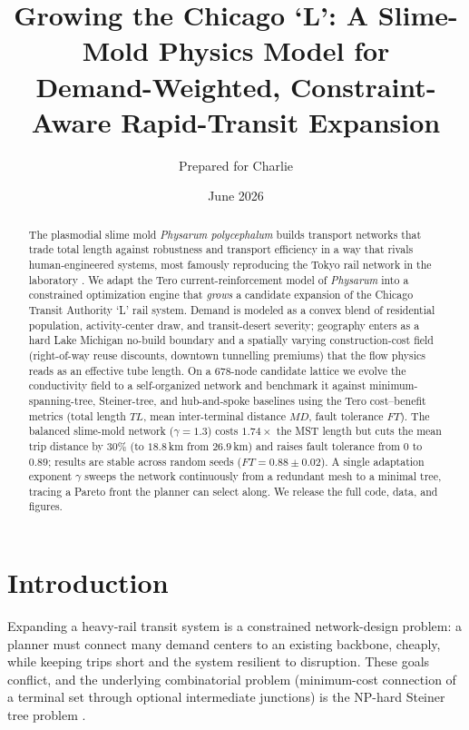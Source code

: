 \documentclass[11pt]{article}
\title{\bfseries Growing the Chicago `L': A Slime-Mold Physics Model for \\
Demand-Weighted, Constraint-Aware Rapid-Transit Expansion}
\author{Prepared for Charlie}
\date{June 2026}
\begin{document}
\maketitle

\begin{abstract}
\noindent The plasmodial slime mold \emph{Physarum polycephalum} builds transport
networks that trade total length against robustness and transport efficiency in a
way that rivals human-engineered systems, most famously reproducing the Tokyo rail
network in the laboratory \citep{tero2010}. We adapt the Tero current-reinforcement
model of \emph{Physarum} into a constrained optimization engine that \emph{grows} a
candidate expansion of the Chicago Transit Authority `L' rail system. Demand is
modeled as a convex blend of residential population, activity-center draw, and
transit-desert severity; geography enters as a hard Lake Michigan no-build boundary
and a spatially varying construction-cost field (right-of-way reuse discounts,
downtown tunnelling premiums) that the flow physics reads as an effective tube
length. On a $678$-node candidate lattice we evolve the conductivity field to a
self-organized network and benchmark it against minimum-spanning-tree, Steiner-tree,
and hub-and-spoke baselines using the Tero cost--benefit metrics (total length $TL$,
mean inter-terminal distance $MD$, fault tolerance $FT$). The balanced slime-mold
network ($\gamma=1.3$) costs $1.74\times$ the MST length but cuts the mean trip
distance by $30\%$ (to $18.8$\,km from $26.9$\,km) and raises fault tolerance from
$0$ to $0.89$; results are stable across random seeds ($FT=0.88\pm0.02$). A single
adaptation exponent $\gamma$ sweeps the network continuously from a redundant mesh
to a minimal tree, tracing a Pareto front the planner can select along. We release
the full code, data, and figures.
\end{abstract}

\section{Introduction}
Expanding a heavy-rail transit system is a constrained network-design problem: a
planner must connect many demand centers to an existing backbone, cheaply, while
keeping trips short and the system resilient to disruption. These goals conflict,
and the underlying combinatorial problem (minimum-cost connection of a terminal set
through optional intermediate junctions) is the NP-hard Steiner tree problem
\citep{hwang1992}.
\end{document}

